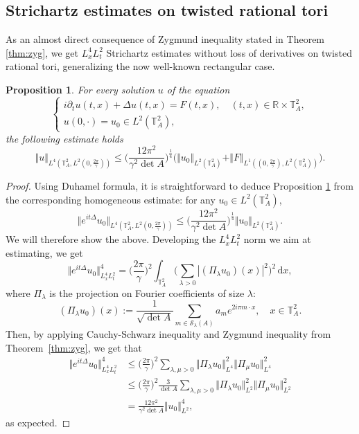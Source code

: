 \documentclass[a4paper,11pt]{amsart}
\numberwithin{equation}{section}
\newtheorem{prop}[thm]{Proposition}
\theoremstyle{definition}
\newcommand{\twotorus}{\mathbb T^2_A}
\begin{document}
\subsection{Strichartz estimates on twisted rational tori} As an almost direct consequence of Zygmund inequality stated in Theorem \ref{thm:zyg}, we get 
$L^4_xL^2_t$ Strichartz estimates without loss of derivatives on twisted rational tori, generalizing the now well-known rectangular case. 
\begin{prop}\label{prop:striinhomo} 
For every solution $u$ of the equation
$$
\begin{cases}
	i\partial_t u(t,x) + \Delta u(t,x) = F(t,x),\quad (t,x)\in\mathbb R\times\twotorus, \\
	u(0,\cdot) = u_0\in L^2(\twotorus),
\end{cases}
$$
the following estimate holds
\begin{equation*}
	\Vert u\Vert_{L^4(\twotorus,L^2(0, \frac{2\pi}{\gamma}))}
	\le\bigg(\frac{12\pi^2}{\gamma^2\det A}\bigg)^{\frac14}\big(\Vert u_0\Vert_{L^2(\twotorus)} + \Vert F\Vert_{L^1((0,\frac{2\pi}{\gamma}),L^2(\twotorus))}\big).
\end{equation*}
\end{prop}

\begin{proof}
Using Duhamel formula, it is straightforward to deduce Proposition \ref{prop:striinhomo} from the corresponding homogeneous estimate: for any $u_0 \in L^2(\twotorus)$,
$$
\big\Vert e^{it\Delta} u_0 \big\Vert_{L^4(\twotorus,L^2(0, \frac{2\pi}{\gamma}))}	\le\bigg(\frac{12\pi^2}{\gamma^2\det A}\bigg)^{\frac14}\Vert u_0\Vert_{L^2(\twotorus)}.
$$
We will therefore show the above.
Developing the $L^4_x L^2_t$ norm we aim at estimating, we get
\[
	\big\Vert e^{it\Delta}u_0\big\Vert^4_{L^4_xL^2_t} 
	= \bigg(\frac{2\pi}{\gamma}\bigg)^2\int_{\twotorus} \bigg( \sum_{\lambda>0} |(\Pi_\lambda u_0) (x)|^2\bigg)^2 \,\mathrm dx,
\]
where $\Pi_\lambda$ is the projection on Fourier coefficients of size $\lambda$:
\[
    (\Pi_\lambda u_0)(x) := \frac1{\sqrt{\det A}}\sum_{m\in\mathcal S_{\lambda}(A)} a_m e^{2i\pi m\cdot x},\quad x\in\twotorus.
\]
Then, by applying Cauchy-Schwarz inequality and Zygmund inequality from Theorem~\ref{thm:zyg}, we get that
\begin{align*}
    \big\Vert e^{it\Delta}u_0\big\Vert^4_{L^4_xL^2_t} 
    & \le \bigg(\frac{2\pi}{\gamma}\bigg)^2\sum_{\lambda,\mu>0}\Vert\Pi_{\lambda}u_0\Vert^2_{L^4}\Vert\Pi_{\mu}u_0\Vert^2_{L^4} \\[5pt]
    & \le \bigg(\frac{2\pi}{\gamma}\bigg)^2\frac{3}{\det A}
    \sum_{\lambda,\mu>0}\Vert\Pi_{\lambda}u_0\Vert^2_{L^2}\Vert\Pi_{\mu}u_0\Vert^2_{L^2} \\[5pt]
    & = \frac{12\pi^2}{\gamma^2\det A}\Vert u_0\Vert^4_{L^2},
\end{align*}
as expected. 
\end{proof}
\end{document}
